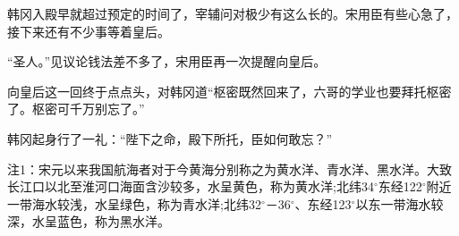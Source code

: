 韩冈入殿早就超过预定的时间了，宰辅问对极少有这么长的。宋用臣有些心急了，接下来还有不少事等着皇后。

“圣人。”见议论钱法差不多了，宋用臣再一次提醒向皇后。

向皇后这一回终于点点头，对韩冈道“枢密既然回来了，六哥的学业也要拜托枢密了。枢密可千万别忘了。”

韩冈起身行了一礼：“陛下之命，殿下所托，臣如何敢忘？”


注1：宋元以来我国航海者对于今黄海分别称之为黄水洋、青水洋、黑水洋。大致长江口以北至淮河口海面含沙较多，水呈黄色，称为黄水洋;北纬34\ensuremath{^{\circ}}东经122\ensuremath{^{\circ}}附近一带海水较浅，水呈绿色，称为青水洋;北纬32\ensuremath{^{\circ}}－36\ensuremath{^{\circ}}、东经123\ensuremath{^{\circ}}以东一带海水较深，水呈蓝色，称为黑水洋。
